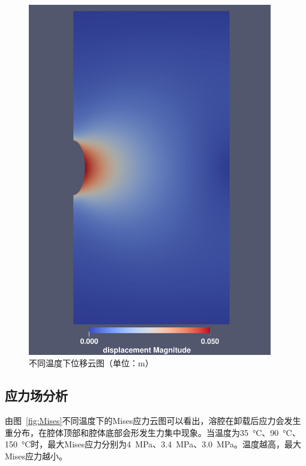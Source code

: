 \begin{figure}[ht!]
{\begin{minipage}{7cm}
            \includegraphics[width=0.95\textwidth]{img/chap4/150weiyi.pdf}
        \end{minipage}
    }
    \caption{不同温度下位移云图（单位：m）}
    \label{weiyiyuntu}
\end{figure}




\subsection{应力场分析}

由图~\ref{fig:Mises}不同温度下的Mises应力云图可以看出，溶腔在卸载后应力会发生重分布，在腔体顶部和腔体底部会形发生力集中现象。当温度为\SI{35}{\celsius}、\SI{90}{\celsius}、\SI{150}{\celsius}时，最大Mises应力分别为\SI{4}{MPa}、\SI{3.4}{MPa}、\SI{3.0}{MPa}。温度越高，最大Mises应力越小。


